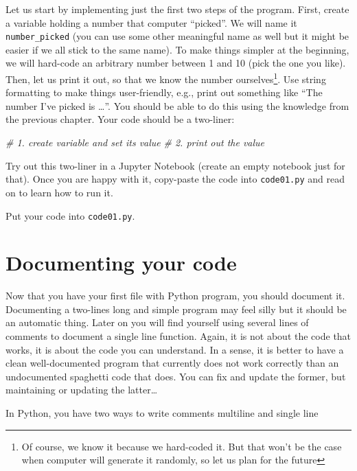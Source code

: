 \documentclass[
]{book}
\newenvironment{Shaded}{\begin{snugshade}}{\end{snugshade}}
\newcommand{\CommentTok}[1]{\textcolor[rgb]{0.56,0.35,0.01}{\textit{#1}}}
\begin{document}
Let us start by implementing just the first two steps of the program. First, create a variable holding a number that computer ``picked''. We will name it \texttt{number\_picked} (you can use some other meaningful name as well but it might be easier if we all stick to the same name). To make things simpler at the beginning, we will hard-code an arbitrary number between 1 and 10 (pick the one you like). Then, let us print it out, so that we know the number ourselves\footnote{Of course, we know it because we hard-coded it. But that won't be the case when computer will generate it randomly, so let us plan for the future}. Use string formatting to make things user-friendly, e.g., print out something like ``The number I've picked is \ldots{}''. You should be able to do this using the knowledge from the previous chapter. Your code should be a two-liner:

\begin{Shaded}
\begin{Highlighting}[]
\CommentTok{\# 1. create variable and set its value}
\CommentTok{\# 2. print out the value}
\end{Highlighting}
\end{Shaded}

Try out this two-liner in a Jupyter Notebook (create an empty notebook just for that). Once you are happy with it, copy-paste the code into \texttt{code01.py} and read on to learn how to run it.

Put your code into \texttt{code01.py}.

\hypertarget{documenting-your-code}{%
\section{Documenting your code}\label{documenting-your-code}}

Now that you have your first file with Python program, you should document it. Documenting a two-lines long and simple program may feel silly but it should be an automatic thing. Later on you will find yourself using several lines of comments to document a single line function. Again, it is not about the code that works, it is about the code you can understand. In a sense, it is better to have a clean well-documented program that currently does not work correctly than an undocumented spaghetti code that does. You can fix and update the former, but maintaining or updating the latter\ldots{}

In Python, you have two ways to write comments multiline and single line
\end{document}
